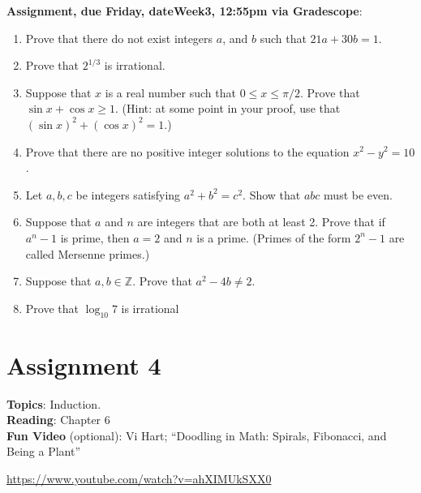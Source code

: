 \documentclass[12pt]{article}
\newcommand{\HWdueTime}{12:55pm }
\begin{document}
\noindent \textbf{Assignment, due Friday, \csname dateWeek3\endcsname, \HWdueTime via Gradescope}:
\begin{enumerate}
\item Prove that there do not exist integers $a$, and $b$ such that $21a + 30b = 1$.
\item Prove that $2^{1/3}$ is irrational.
\item Suppose that $x$ is a real number such that $0 \leq x \leq \pi/2$. Prove that $\sin x + \cos x \geq 1$. (Hint: at some point in your proof, use that $(\sin x)^2 + (\cos x)^2 = 1$.)
\item Prove that there are no positive integer solutions to the equation $x^2 - y^2 = 10$.
\item Let $a, b, c$ be integers satisfying $a^2 + b^2 = c^2$. Show that $abc$ must be even. %
\item Suppose that $a$ and $n$ are integers that are both at least 2. Prove that if $a^n -1$ is prime, then $a = 2$ and $n$ is a prime. (Primes of the form $2^n - 1$ are called Mersenne primes.)
\item Suppose that $a,b \in \mathbb{Z}$. Prove that $a^2 - 4b \neq 2$.

\item Prove that $\log_{10} 7$ is irrational
\end{enumerate}


\newpage
\section[4 (due \csname dateWeek4\endcsname): Induction.]{Assignment 4}

\noindent\textbf{Topics}: Induction.
\\

\noindent \textbf{Reading}: Chapter 6
\\

\noindent \textbf{Fun Video} (optional): Vi Hart; ``Doodling in Math: Spirals, Fibonacci, and Being a Plant''

\noindent \url{https://www.youtube.com/watch?v=ahXIMUkSXX0}
\\ 
\end{document}
